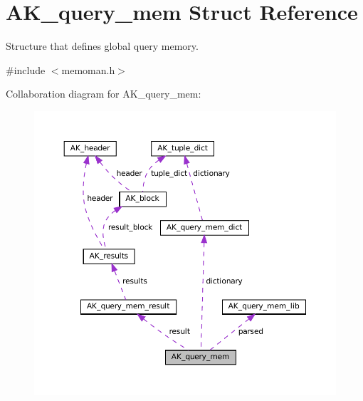 \hypertarget{structAK__query__mem}{}\section{A\+K\+\_\+query\+\_\+mem Struct Reference}
\label{structAK__query__mem}


Structure that defines global query memory.  




{\ttfamily \#include $<$memoman.\+h$>$}



Collaboration diagram for A\+K\+\_\+query\+\_\+mem\+:\nopagebreak
\begin{figure}[H]
\begin{center}
\leavevmode
\includegraphics[width=350pt]{structAK__query__mem__coll__graph}
\end{center}
\end{figure}
